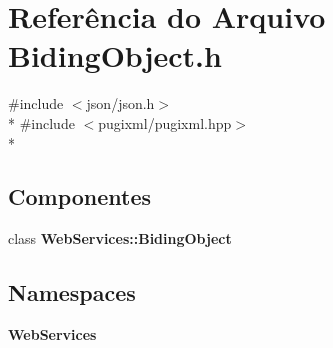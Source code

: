 \section{Referência do Arquivo Biding\+Object.\+h}
\label{_biding_object_8h}
{\ttfamily \#include $<$json/json.\+h$>$}\\*
{\ttfamily \#include $<$pugixml/pugixml.\+hpp$>$}\\*
\subsection*{Componentes}
\begin{DoxyCompactItemize}
\item 
class {\bf Web\+Services\+::\+Biding\+Object}
\end{DoxyCompactItemize}
\subsection*{Namespaces}
\begin{DoxyCompactItemize}
\item 
 {\bf Web\+Services}
\end{DoxyCompactItemize}
